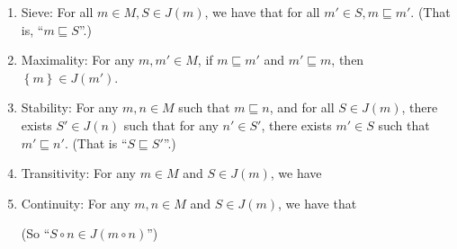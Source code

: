 \documentclass{article}
\newcommand{\setof}[1]{\left\{{#1}\right\}}
\newcommand{\comprehend}[2]{\setof{{#1}\;|\;{#2}}}
\begin{document}
\begin{enumerate}
\item Sieve: For all $m \in M, S \in J(m)$, we have that for all $m' \in S, m \sqsubseteq m'$. (That is,
``$m \sqsubseteq S$''.) 

\item Maximality: For any $m, m' \in M$, if $m \sqsubseteq m'$ and $m' \sqsubseteq m$, then $\setof{m} \in J(m')$. 

\item Stability: For any $m, n \in M$ such that $m \sqsubseteq n$, and for all $S \in J(m)$, there
  exists $S' \in J(n)$ such that for any $n' \in S'$, there exists $m' \in S$ such that $m' \sqsubseteq n'$. (That is
  ``$S \sqsubseteq S'$''.)

\item Transitivity: For any $m \in M$ and $S \in J(m)$, we have 

\item Continuity: For any $m,n \in M$ and $S \in J(m)$, we have that 
(So ``$S \circ n \in J(m \circ n)$'')
\end{enumerate}
\end{document}
